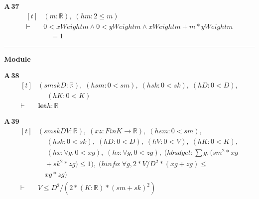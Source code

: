 \noindent\textbf{A\,37}\quad{}
{\footnotesize\[ \begin{aligned}[t]
&(\mathit{m} : \mathbb{R} ),\; (\mathit{hm} : 2 \leq \mathit{m})\\
\vdash\;&0 < \mathit{xWeight} \mathit{m} \wedge 0 < \mathit{yWeight} \mathit{m} \wedge \mathit{xWeight} \mathit{m} + \mathit{m}*\mathit{yWeight} \mathit{m}\\
&\quad = 1
\end{aligned} \]}

\vspace{4pt}\noindent\rule{\columnwidth}{0.4pt}\par\vspace{2pt}
\noindent\textbf{Module }\par\vspace{3pt}

\noindent\textbf{A\,38}\quad{}
{\footnotesize\[ \begin{aligned}[t]
&(\mathit{sm} \mathit{sk} \mathit{D} : \mathbb{R} ),\; (\mathit{hsm} : 0 < \mathit{sm}),\; (\mathit{hsk} : 0 < \mathit{sk}),\; (\mathit{hD} : 0 < \mathit{D}),\\
&\quad \; (\mathit{hK} : 0 < \mathit{K})\\
\vdash\;&\mathbf{let} \mathit{h} : \mathbb{R}
\end{aligned} \]}

\noindent\textbf{A\,39}\quad{}
{\footnotesize\[ \begin{aligned}[t]
&(\mathit{sm} \mathit{sk} \mathit{D} \mathit{V} : \mathbb{R} ),\; (\mathit{x} \mathit{z} : \mathit{Fin} \mathit{K} \to \mathbb{R} ),\; (\mathit{hsm} : 0 < \mathit{sm}),\\
&\quad \; (\mathit{hsk} : 0 < \mathit{sk}),\; (\mathit{hD} : 0 < \mathit{D}),\; (\mathit{hV} : 0 < \mathit{V}),\; (\mathit{hK} : 0 < \mathit{K}),\\
&\quad \; (\mathit{hx} : \forall \mathit{g}, 0 < \mathit{x} \mathit{g}),\; (\mathit{hz} : \forall \mathit{g}, 0 < \mathit{z} \mathit{g}),\; (\mathit{hbudget} : \textstyle\sum \mathit{g}, (\mathit{sm} ^{2} * \mathit{x} \mathit{g}\\
&\quad + \mathit{sk} ^{2} * \mathit{z} \mathit{g}) \leq 1),\; (\mathit{hinfo} : \forall \mathit{g}, 2 * \mathit{V} / \mathit{D} ^{2} * (\mathit{x} \mathit{g} + \mathit{z} \mathit{g}) \leq\\
&\quad \mathit{x} \mathit{g} * \mathit{z} \mathit{g})\\
\vdash\;&\mathit{V} \leq \mathit{D} ^{2} / (2 * (\mathit{K} : \mathbb{R} ) * (\mathit{sm} + \mathit{sk}) ^{2})
\end{aligned} \]}

